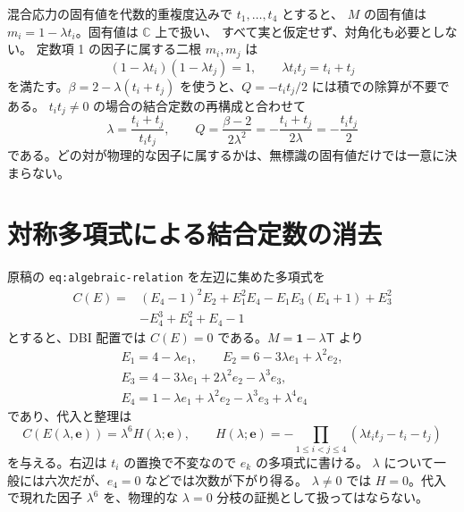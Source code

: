 \documentclass[11pt,a4paper]{article}
\newcommand{\Id}{\mathbf{1}}
\newcommand{\Tmix}{\mathsf T}
\newcommand{\ee}{\boldsymbol e}
\begin{document}
混合応力の固有値を代数的重複度込みで $t_1,\ldots,t_4$ とすると、
$M$ の固有値は $m_i=1-\lambda t_i$。固有値は $\mathbb C$ 上で扱い、
すべて実と仮定せず、対角化も必要としない。
定数項 1 の因子に属する二根 $m_i,m_j$ は
\begin{equation}\label{eq:pair}
(1-\lambda t_i)(1-\lambda t_j)=1,
\qquad \lambda t_it_j=t_i+t_j
\end{equation}
を満たす。$\beta=2-\lambda(t_i+t_j)$ を使うと、$Q=-t_it_j/2$ には積での除算が不要である。
$t_it_j\ne0$ の場合の結合定数の再構成と合わせて
\begin{equation}\label{eq:pair-flow}
\boxed{\lambda=\frac{t_i+t_j}{t_it_j},\qquad
Q=\frac{\beta-2}{2\lambda^2}
=-\frac{t_i+t_j}{2\lambda}=-\frac{t_it_j}{2}}
\end{equation}
である。どの対が物理的な因子に属するかは、無標識の固有値だけでは一意に決まらない。

\newpage
\section{対称多項式による結合定数の消去}
原稿の \texttt{eq:algebraic-relation} を左辺に集めた多項式を
\begin{equation}\label{eq:C}
\begin{split}
C(E)={}&(E_4-1)^2E_2+E_1^2E_4-E_1E_3(E_4+1)+E_3^2\\
 &-E_4^3+E_4^2+E_4-1
\end{split}
\end{equation}
とすると、DBI 配置では $C(E)=0$ である。$M=\Id-\lambda\Tmix$ より
\begin{equation}\label{eq:transform}
\begin{gathered}
E_1=4-\lambda e_1,\qquad E_2=6-3\lambda e_1+\lambda^2e_2,\\
E_3=4-3\lambda e_1+2\lambda^2e_2-\lambda^3e_3,\\
E_4=1-\lambda e_1+\lambda^2e_2-\lambda^3e_3+\lambda^4e_4
\end{gathered}
\end{equation}
であり、代入と整理は
\begin{equation}\label{eq:H}
C(E(\lambda,\ee))=\lambda^6H(\lambda;\ee),\qquad
H(\lambda;\ee)=-\prod_{1\leq i<j\leq4}
 (\lambda t_it_j-t_i-t_j)
\end{equation}
を与える。右辺は $t_i$ の置換で不変なので $e_k$ の多項式に書ける。
$\lambda$ について一般には六次だが、$e_4=0$ などでは次数が下がり得る。
$\lambda\ne0$ では $H=0$。代入で現れた因子 $\lambda^6$ を、物理的な
$\lambda=0$ 分枝の証拠として扱ってはならない。
\end{document}
